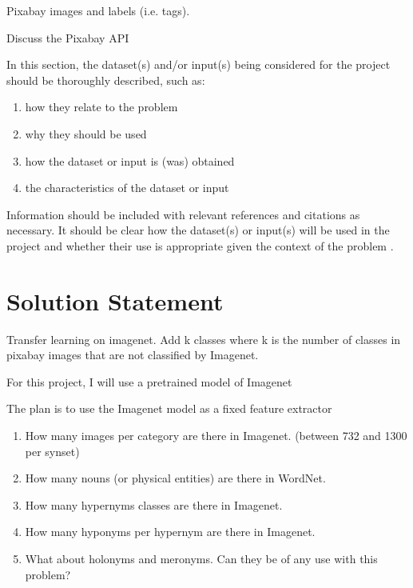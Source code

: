 \documentclass[10pt, a4paper, twocolumn]{article} %
\begin{document}
Pixabay images and labels (i.e. tags).

Discuss the Pixabay API

In this section, the dataset(s) and/or input(s) being considered for the project should be thoroughly described, such as: 

\begin{enumerate}
	\item how they relate to the problem
	\item why they should be used
	\item how the dataset or input is (was) obtained
	\item the characteristics of the dataset or input
\end{enumerate}

Information should be included with relevant references and citations as necessary. It should be clear how the dataset(s) or input(s) will be used in the project and whether their use is appropriate given the context of the problem \citep{Herrera:2016,Read:2011:CCM:2070617.2070629,Zhang:2006,DBLP:journals/corr/DaveTEV16,Miller:1995,Fellbaum:1998,Zhang:2017,2017arXiv171009230L,2017arXiv171008049W,2015arXiv151105616H,2014arXiv1406.5726W}.

\section{Solution Statement} %

Transfer learning on imagenet.  Add k classes where k is the number of classes in pixabay images that are not classified by Imagenet.

For this project, I will use a pretrained model of Imagenet

The plan is to use the Imagenet model as a fixed feature extractor

\begin{enumerate}
	\item How many images per category are there in Imagenet. (between 732 and 1300 per synset)
	\item How many nouns (or physical entities) are there in WordNet.
	\item How many hypernyms classes are there in Imagenet. 
	\item How many hyponyms per hypernym are there in Imagenet.
	\item What about holonyms and meronyms. Can they be of any use with this problem?
\end{enumerate}
\end{document}
